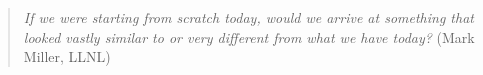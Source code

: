 

\begin{quote}
\textit{If we were starting from scratch today, would we arrive at something that looked vastly similar to or very different from what we have today?} (Mark Miller, LLNL)
\end{quote}